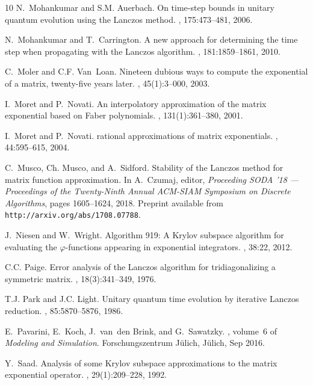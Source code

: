 \documentclass[smallextended]{svjour3pre}%
\numberwithin{equation}{section}
\numberwithin{figure}{section}
\numberwithin{table}{section}
\begin{document}
\begin{thebibliography}{10}
N.~Mohankumar and S.M. Auerbach.
\newblock On time-step bounds in unitary quantum evolution using the {L}anczos
  method.
, 175:473--481, 2006.

N.~Mohankumar and T.~Carrington.
\newblock A new approach for determining the time step when propagating with
  the {L}anczos algorithm.
, 181:1859--1861, 2010.

C.~Moler and C.F. Van~Loan.
\newblock Nineteen dubious ways to compute the exponential of a matrix,
  twenty-five years later.
, 45(1):3--000, 2003.

I.~Moret and P.~Novati.
\newblock An interpolatory approximation of the matrix exponential based on
  {F}aber polynomials.
, 131(1):361--380, 2001.

I.~Moret and P.~Novati.
 rational approximations of matrix exponentials.
, 44:595--615, 2004.

C.~Musco, Ch. Musco, and A.~Sidford.
\newblock Stability of the {L}anczos method for matrix function approximation.
\newblock In A.~Czumaj, editor, {\em Proceeding SODA '18 --- Proceedings of the
  Twenty-Ninth Annual ACM-SIAM Symposium on Discrete Algorithms}, pages
  1605--1624, 2018.
\newblock Preprint available from \texttt{http://arxiv.org/abs/1708.07788}.

J.~Niesen and W.~Wright.
\newblock Algorithm 919: A {K}rylov subspace algorithm for evaluating the
  $\varphi$-functions appearing in exponential integrators.
, 38:22, 2012.

C.C. Paige.
\newblock Error analysis of the {L}anczos algorithm for tridiagonalizing a
  symmetric matrix.
, 18(3):341--349, 1976.

T.J. Park and J.C. Light.
\newblock Unitary quantum time evolution by iterative {L}anczos reduction.
, 85:5870--5876, 1986.

E.~Pavarini, E.~Koch, J.~van~den Brink, and G.~Sawatzky.
, volume~6 of
  {\em Modeling and Simulation}.
\newblock Forschungszentrum J{\"u}lich, J{\"u}lich, Sep 2016.

Y.~Saad.
\newblock Analysis of some {K}rylov subspace approximations to the matrix
  exponential operator.
, 29(1):209--228, 1992.


\end{thebibliography}
\end{document}
